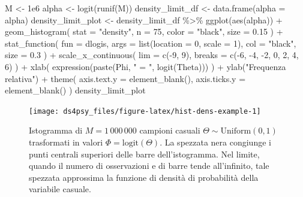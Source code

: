 \documentclass[
  11pt,
]{krantz}
\makeatletter
\newenvironment{Shaded}{\begin{snugshade}}{\end{snugshade}}
\newcommand{\AttributeTok}[1]{\textcolor[rgb]{0.61,0.61,0.61}{#1}}
\newcommand{\DecValTok}[1]{\textcolor[rgb]{0.06,0.06,0.06}{#1}}
\newcommand{\FloatTok}[1]{\textcolor[rgb]{0.06,0.06,0.06}{#1}}
\newcommand{\FunctionTok}[1]{\textcolor[rgb]{0,0,0}{#1}}
\newcommand{\NormalTok}[1]{#1}
\newcommand{\OtherTok}[1]{\textcolor[rgb]{0.37,0.37,0.37}{#1}}
\newcommand{\SpecialCharTok}[1]{\textcolor[rgb]{0,0,0}{#1}}
\newcommand{\StringTok}[1]{\textcolor[rgb]{0.5,0.5,0.5}{#1}}
\newenvironment{kframe}{%
\medskip{}
\setlength{\fboxsep}{.8em}
 \def\at@end@of@kframe{}%
 \ifinner\ifhmode%
  \def\at@end@of@kframe{\end{minipage}}%
  \begin{minipage}{\columnwidth}%
 \fi\fi%
 \def\FrameCommand##1{\hskip\@totalleftmargin \hskip-\fboxsep
 \colorbox{shadecolor}{##1}\hskip-\fboxsep
     \hskip-\linewidth \hskip-\@totalleftmargin \hskip\columnwidth}%
 \MakeFramed {\advance\hsize-\width
   \@totalleftmargin\z@ \linewidth\hsize
   \@setminipage}}%
 {\par\unskip\endMakeFramed%
 \at@end@of@kframe}
\renewenvironment{Shaded}{\begin{kframe}}{\end{kframe}}
\theoremstyle{definition}
\theoremstyle{definition}
\theoremstyle{definition}
\theoremstyle{definition}
\theoremstyle{remark}
\makeatother
\begin{document}
\begin{Shaded}
\begin{Highlighting}[]
\NormalTok{M }\OtherTok{\textless{}{-}} \FloatTok{1e6}
\NormalTok{alpha }\OtherTok{\textless{}{-}} \FunctionTok{logit}\NormalTok{(}\FunctionTok{runif}\NormalTok{(M))}
\NormalTok{density\_limit\_df }\OtherTok{\textless{}{-}} \FunctionTok{data.frame}\NormalTok{(}\AttributeTok{alpha =}\NormalTok{ alpha)}
\NormalTok{density\_limit\_plot }\OtherTok{\textless{}{-}}
\NormalTok{  density\_limit\_df }\SpecialCharTok{\%\textgreater{}\%}
  \FunctionTok{ggplot}\NormalTok{(}\FunctionTok{aes}\NormalTok{(alpha)) }\SpecialCharTok{+}
  \FunctionTok{geom\_histogram}\NormalTok{(}
    \AttributeTok{stat =} \StringTok{"density"}\NormalTok{, }\AttributeTok{n =} \DecValTok{75}\NormalTok{, }\AttributeTok{color =} \StringTok{"black"}\NormalTok{, }\AttributeTok{size =} \FloatTok{0.15}
\NormalTok{  ) }\SpecialCharTok{+}
  \FunctionTok{stat\_function}\NormalTok{(}
    \AttributeTok{fun =}\NormalTok{ dlogis,}
    \AttributeTok{args =} \FunctionTok{list}\NormalTok{(}\AttributeTok{location =} \DecValTok{0}\NormalTok{, }\AttributeTok{scale =} \DecValTok{1}\NormalTok{),}
    \AttributeTok{col =} \StringTok{"black"}\NormalTok{,}
    \AttributeTok{size =} \FloatTok{0.3}
\NormalTok{  ) }\SpecialCharTok{+}
  \FunctionTok{scale\_x\_continuous}\NormalTok{(}
    \AttributeTok{lim =} \FunctionTok{c}\NormalTok{(}\SpecialCharTok{{-}}\DecValTok{9}\NormalTok{, }\DecValTok{9}\NormalTok{),}
    \AttributeTok{breaks =} \FunctionTok{c}\NormalTok{(}\SpecialCharTok{{-}}\DecValTok{6}\NormalTok{, }\SpecialCharTok{{-}}\DecValTok{4}\NormalTok{, }\SpecialCharTok{{-}}\DecValTok{2}\NormalTok{, }\DecValTok{0}\NormalTok{, }\DecValTok{2}\NormalTok{, }\DecValTok{4}\NormalTok{, }\DecValTok{6}\NormalTok{)}
\NormalTok{  ) }\SpecialCharTok{+}
  \FunctionTok{xlab}\NormalTok{(}
    \FunctionTok{expression}\NormalTok{(}\FunctionTok{paste}\NormalTok{(Phi, }\StringTok{" = "}\NormalTok{, }\FunctionTok{logit}\NormalTok{(Theta)))}
\NormalTok{  ) }\SpecialCharTok{+}
  \FunctionTok{ylab}\NormalTok{(}\StringTok{"Frequenza relativa"}\NormalTok{) }\SpecialCharTok{+}
  \FunctionTok{theme}\NormalTok{(}
    \AttributeTok{axis.text.y =} \FunctionTok{element\_blank}\NormalTok{(),}
    \AttributeTok{axis.ticks.y =} \FunctionTok{element\_blank}\NormalTok{()}
\NormalTok{  )}
\NormalTok{density\_limit\_plot}
\end{Highlighting}
\end{Shaded}

\begin{figure}

{\centering \texttt{[image: ds4psy\_files/figure-latex/hist-dens-example-1]} 

}

\caption{Istogramma di $M = 1\,000\,000$ campioni casuali $\Theta \sim \mbox{Uniform}(0,1)$ trasformati in valori $\Phi = \mbox{logit}(\Theta)$. La spezzata nera congiunge i punti centrali superiori delle barre dell'istogramma. Nel limite, quando il numero di osservazioni e di barre tende all'infinito, tale spezzata approssima la funzione di densità di probabilità della variabile casuale.}\label{fig:hist-dens-example}
\end{figure}
\end{document}
